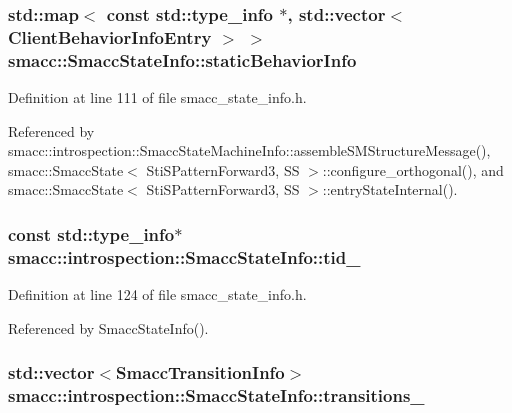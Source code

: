 \subsubsection[{\texorpdfstring{static\+Behavior\+Info}{staticBehaviorInfo}}]{\setlength{\rightskip}{0pt plus 5cm}std\+::map$<$ const std\+::type\+\_\+info $\ast$, std\+::vector$<$ {\bf Client\+Behavior\+Info\+Entry} $>$ $>$ smacc\+::\+Smacc\+State\+Info\+::static\+Behavior\+Info\hspace{0.3cm}{\ttfamily [static]}}\hypertarget{classsmacc_1_1introspection_1_1SmaccStateInfo_ad3d8b3450060cb0b91f38fb2fe0a7678}{}\label{classsmacc_1_1introspection_1_1SmaccStateInfo_ad3d8b3450060cb0b91f38fb2fe0a7678}


Definition at line 111 of file smacc\+\_\+state\+\_\+info.\+h.



Referenced by smacc\+::introspection\+::\+Smacc\+State\+Machine\+Info\+::assemble\+S\+M\+Structure\+Message(), smacc\+::\+Smacc\+State$<$ Sti\+S\+Pattern\+Forward3, S\+S $>$\+::configure\+\_\+orthogonal(), and smacc\+::\+Smacc\+State$<$ Sti\+S\+Pattern\+Forward3, S\+S $>$\+::entry\+State\+Internal().

\subsubsection[{\texorpdfstring{tid\+\_\+}{tid_}}]{\setlength{\rightskip}{0pt plus 5cm}const std\+::type\+\_\+info$\ast$ smacc\+::introspection\+::\+Smacc\+State\+Info\+::tid\+\_\+}\hypertarget{classsmacc_1_1introspection_1_1SmaccStateInfo_a37d0d0bce171b57b8d3a39f44ab45248}{}\label{classsmacc_1_1introspection_1_1SmaccStateInfo_a37d0d0bce171b57b8d3a39f44ab45248}


Definition at line 124 of file smacc\+\_\+state\+\_\+info.\+h.



Referenced by Smacc\+State\+Info().

\subsubsection[{\texorpdfstring{transitions\+\_\+}{transitions_}}]{\setlength{\rightskip}{0pt plus 5cm}std\+::vector$<${\bf Smacc\+Transition\+Info}$>$ smacc\+::introspection\+::\+Smacc\+State\+Info\+::transitions\+\_\+}\hypertarget{classsmacc_1_1introspection_1_1SmaccStateInfo_ae8b5d8e409e377ef9a88d92fb31a8446}{}\label{classsmacc_1_1introspection_1_1SmaccStateInfo_ae8b5d8e409e377ef9a88d92fb31a8446}


